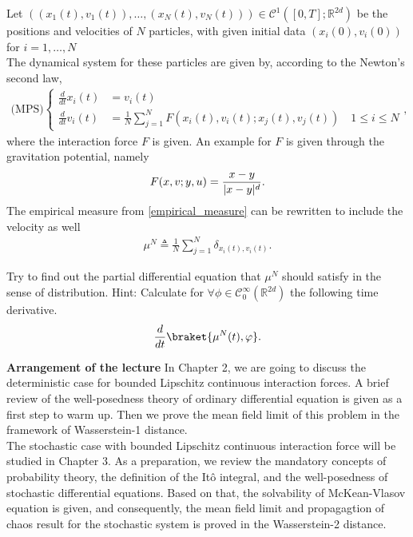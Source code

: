 Let $  ((x_{1}(t),v_{1}(t)),\ldots ,(x_N(t),v_N(t))) \in \mathcal{C}^{1}([0,T];\mathbb{R}^{2d} ) $ be the positions and velocities of $N$ particles, with given initial data
$(x_i(0),v_i(0))$  for $i = 1,\ldots ,N$\\[1ex]
The dynamical system for these particles are given by, according to the Newton's second law,  
  \begin{align*}
    \text{(MPS)}\begin{cases}
      \frac{d}{dt} x_i(t) &= v_i(t) \\
      \frac{d}{dt} v_i(t) &= \frac{1}{N} \sum_{j=1}^{N} F(x_{i}(t),v_i(t) ; x_j(t),v_j(t) )  \quad 1\le i\le N
    \end{cases}
  ,\end{align*}
where the interaction force $F$ is given. An example for $F$ is given through the gravitation potential, namely 
\begin{align*}
  F(x,v;y,u) = \frac{x-y}{\lvert x-y\rvert^{d} }
.\end{align*}
The empirical measure from \autoref{empirical_measure} can be rewritten to include the velocity as well 
\begin{align*}
  \mu^N \triangleq \frac{1}{N} \sum_{j=1}^{N} \delta_{x_i(t),v_i(t)} 
.\end{align*}
\begin{exercise}
Try to find out the partial differential equation that $\mu^N$ should satisfy in the sense of distribution. Hint: Calculate  for $\forall  \phi  \in  \mathcal{C}_0^{\infty}(\mathbb{R}^{2d} ) $  the following time derivative.
 \begin{align*}
   \frac{d}{dt} \braket{\mu^N(t),\phi }
 .\end{align*}
\end{exercise}
\newpage
{\bf Arrangement of the lecture}
In Chapter 2, we are going to discuss the deterministic case for bounded Lipschitz continuous interaction forces. A brief review of the well-posedness theory of ordinary
differential equation is given as a first step to warm up. Then we prove the mean field limit of this problem in the framework of Wasserstein-1 distance.\\[1ex]
The stochastic case with bounded Lipschitz continuous interaction force will be studied in Chapter 3. As a preparation, we review the mandatory concepts
of probability theory, the definition of the It\^{o} integral, and the well-posedness of stochastic differential equations. Based on that, the solvability of McKean-Vlasov equation is given, and consequently, the mean field limit and propagagtion of chaos result for the stochastic system is proved in the Wasserstein-2 distance. \\[1ex]
